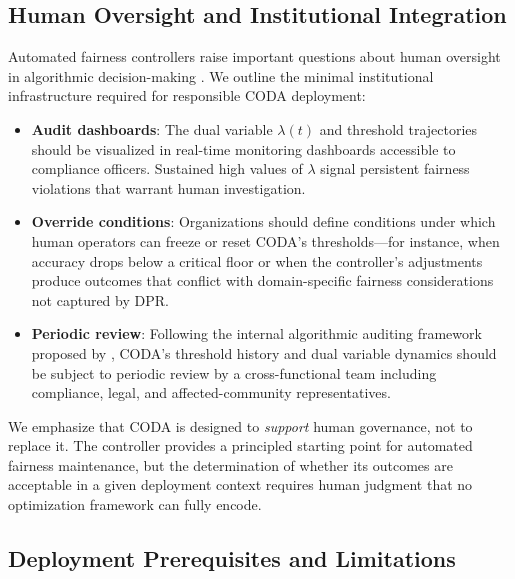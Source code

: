 \documentclass[letterpaper]{article} %
\theoremstyle{definition}
\begin{document}
\subsection{Human Oversight and Institutional Integration}

Automated fairness controllers raise important questions about human oversight in algorithmic decision-making \cite{green2019disparate}. We outline the minimal institutional infrastructure required for responsible CODA deployment:
\begin{itemize}
    \item \textbf{Audit dashboards}: The dual variable $\lambda(t)$ and threshold trajectories should be visualized in real-time monitoring dashboards accessible to compliance officers. Sustained high values of $\lambda$ signal persistent fairness violations that warrant human investigation.
    \item \textbf{Override conditions}: Organizations should define conditions under which human operators can freeze or reset CODA's thresholds---for instance, when accuracy drops below a critical floor or when the controller's adjustments produce outcomes that conflict with domain-specific fairness considerations not captured by DPR.
    \item \textbf{Periodic review}: Following the internal algorithmic auditing framework proposed by \citet{raji2020closing}, CODA's threshold history and dual variable dynamics should be subject to periodic review by a cross-functional team including compliance, legal, and affected-community representatives.
\end{itemize}
We emphasize that CODA is designed to \emph{support} human governance, not to replace it. The controller provides a principled starting point for automated fairness maintenance, but the determination of whether its outcomes are acceptable in a given deployment context requires human judgment that no optimization framework can fully encode.

\subsection{Deployment Prerequisites and Limitations}
\end{document}
